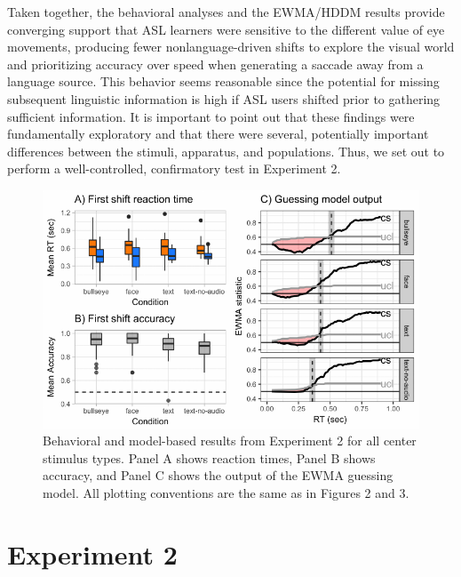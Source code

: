 \documentclass[10pt, letterpaper]{article}
\newenvironment{CodeChunk}{}{}
\begin{document}
Taken together, the behavioral analyses and the EWMA/HDDM results
provide converging support that ASL learners were sensitive to the
different value of eye movements, producing fewer nonlanguage-driven
shifts to explore the visual world and prioritizing accuracy over speed
when generating a saccade away from a language source. This behavior
seems reasonable since the potential for missing subsequent linguistic
information is high if ASL users shifted prior to gathering sufficient
information. It is important to point out that these findings were
fundamentally exploratory and that there were several, potentially
important differences between the stimuli, apparatus, and populations.
Thus, we set out to perform a well-controlled, confirmatory test in
Experiment 2.

\begin{CodeChunk}
\begin{figure}[t]

{\centering \includegraphics{figs/e2_plot-1} 

}

\caption[Behavioral and model-based results from Experiment 2 for all center stimulus types]{Behavioral and model-based results from Experiment 2 for all center stimulus types. Panel A shows reaction times, Panel B shows accuracy, and Panel C shows the output of the EWMA guessing model. All plotting conventions are the same as in Figures 2 and 3.}\label{fig:e2_plot}
\end{figure}
\end{CodeChunk}

\section{Experiment 2}\label{experiment-2}
\end{document}
